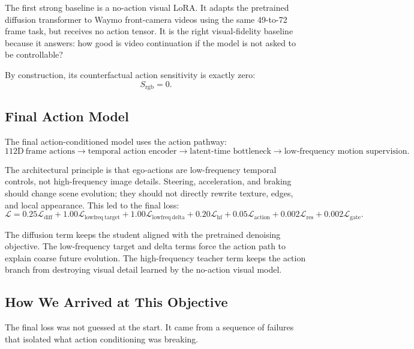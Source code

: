 \documentclass[10pt]{article}
\begin{document}
The first strong baseline is a no-action visual LoRA. It adapts the pretrained diffusion transformer to Waymo front-camera videos using the same 49-to-72 frame task, but receives no action tensor. It is the right visual-fidelity baseline because it answers: how good is video continuation if the model is not asked to be controllable?

By construction, its counterfactual action sensitivity is exactly zero:
\[
S_{\mathrm{rgb}}=0.
\]

\subsection{Final Action Model}

The final action-conditioned model uses the action pathway:
\[
112\mathrm{D}\ \text{frame actions}
\rightarrow
\text{temporal action encoder}
\rightarrow
\text{latent-time bottleneck}
\rightarrow
\text{low-frequency motion supervision}.
\]

The architectural principle is that ego-actions are low-frequency temporal controls, not high-frequency image details. Steering, acceleration, and braking should change scene evolution; they should not directly rewrite texture, edges, and local appearance. This led to the final loss:
\[
\mathcal{L}
=
0.25\mathcal{L}_{\mathrm{diff}}
+ 1.00\mathcal{L}_{\mathrm{lowfreq\ target}}
+ 1.00\mathcal{L}_{\mathrm{lowfreq\ delta}}
+ 0.20\mathcal{L}_{\mathrm{hf}}
+ 0.05\mathcal{L}_{\mathrm{action}}
+ 0.002\mathcal{L}_{\mathrm{res}}
+ 0.002\mathcal{L}_{\mathrm{gate}}.
\]

The diffusion term keeps the student aligned with the pretrained denoising objective. The low-frequency target and delta terms force the action path to explain coarse future evolution. The high-frequency teacher term keeps the action branch from destroying visual detail learned by the no-action visual model.

\subsection{How We Arrived at This Objective}

The final loss was not guessed at the start. It came from a sequence of failures that isolated what action conditioning was breaking.
\end{document}
